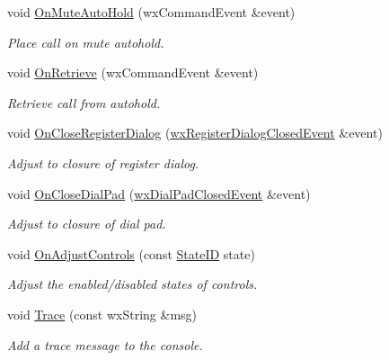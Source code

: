 \begin{CompactItemize}
void \hyperlink{classMainFrame_cc537fb606070bc855356caef79efde8}{OnMuteAutoHold} (wxCommandEvent \&event)
\begin{CompactList}\small\item\em Place call on mute autohold. \item\end{CompactList}\item 
void \hyperlink{classMainFrame_0972eb674b39fe851271e432c2d0eb6c}{OnRetrieve} (wxCommandEvent \&event)
\begin{CompactList}\small\item\em Retrieve call from autohold. \item\end{CompactList}\item 
void \hyperlink{classMainFrame_a23ae1cbbe9db200b96285a46f23b6c3}{OnCloseRegisterDialog} (\hyperlink{classwxRegisterDialogClosedEvent}{wxRegisterDialogClosedEvent} \&event)
\begin{CompactList}\small\item\em Adjust to closure of register dialog. \item\end{CompactList}\item 
void \hyperlink{classMainFrame_c334df080d070c2f82c9457ad132ce18}{OnCloseDialPad} (\hyperlink{classwxDialPadClosedEvent}{wxDialPadClosedEvent} \&event)
\begin{CompactList}\small\item\em Adjust to closure of dial pad. \item\end{CompactList}\item 
void \hyperlink{classMainFrame_cf26ae04d239c8275ea85c5c4fc410e7}{OnAdjustControls} (const \hyperlink{state_8h_2c309f64131cbfdae6d95e6591f208e6}{StateID} state)
\begin{CompactList}\small\item\em Adjust the enabled/disabled states of controls. \item\end{CompactList}\item 
void \hyperlink{classMainFrame_f32b38c49c7276b789284ed9ee92a0c5}{Trace} (const wxString \&msg)
\begin{CompactList}\small\item\em Add a trace message to the console. \item\end{CompactList}\end{CompactItemize}


